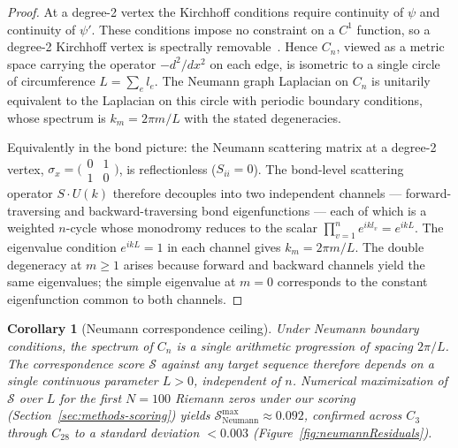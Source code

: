 \documentclass[cntp]{ipart}
\theoremstyle{plain}
\newtheorem{cor}[thm]{Corollary}
\theoremstyle{remark}
\begin{document}
\begin{proof}
At a degree-2 vertex the Kirchhoff conditions require continuity of $\psi$ and continuity of $\psi'$. These conditions impose no constraint on a $C^1$ function, so a degree-2 Kirchhoff vertex is spectrally removable~\cite{r10}. Hence $C_n$, viewed as a metric space carrying the operator $-d^2/dx^2$ on each edge, is isometric to a single circle of circumference $L = \sum_e l_e$. The Neumann graph Laplacian on $C_n$ is unitarily equivalent to the Laplacian on this circle with periodic boundary conditions, whose spectrum is $k_m = 2\pi m / L$ with the stated degeneracies.

Equivalently in the bond picture: the Neumann scattering matrix at a degree-2 vertex, $\sigma_x = \bigl(\begin{smallmatrix} 0 & 1 \\ 1 & 0 \end{smallmatrix}\bigr)$, is reflectionless ($S_{ii} = 0$). The bond-level scattering operator $S \cdot U(k)$ therefore decouples into two independent channels --- forward-traversing and backward-traversing bond eigenfunctions --- each of which is a weighted $n$-cycle whose monodromy reduces to the scalar $\prod_{v=1}^{n} e^{ik l_v} = e^{ikL}$. The eigenvalue condition $e^{ikL} = 1$ in each channel gives $k_m = 2\pi m / L$. The double degeneracy at $m \geq 1$ arises because forward and backward channels yield the same eigenvalues; the simple eigenvalue at $m = 0$ corresponds to the constant eigenfunction common to both channels.
\end{proof}

\begin{cor}[Neumann correspondence ceiling]\label{cor:ceiling}
Under Neumann boundary conditions, the spectrum of $C_n$ is a single arithmetic progression of spacing $2\pi / L$. The correspondence score $\mathcal{S}$ against any target sequence therefore depends on a single continuous parameter $L > 0$, independent of $n$. Numerical maximization of $\mathcal{S}$ over $L$ for the first $N = 100$ Riemann zeros under our scoring (Section~\ref{sec:methods-scoring}) yields $\mathcal{S}_{\mathrm{Neumann}}^{\max} \approx 0.092$, confirmed across $C_3$ through $C_{28}$ to a standard deviation $< 0.003$ (Figure~\ref{fig:neumannResiduals}).
\end{cor}
\end{document}
